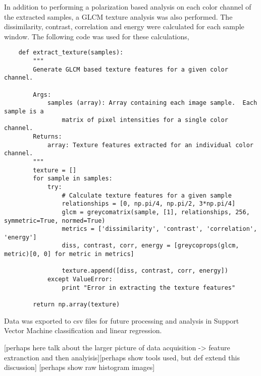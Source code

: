 In addition to performing a polarization based analysis on each color channel of the extracted samples, a GLCM texture analysis was also performed.  The dissimilarity, contrast, correlation and energy were calculated for each sample window.  The following code was used for these calculations,
\begin{lstlisting}
    def extract_texture(samples):
        """
        Generate GLCM based texture features for a given color channel.

        Args:
            samples (array): Array containing each image sample.  Each sample is a
                matrix of pixel intensities for a single color channel.
        Returns:
            array: Texture features extracted for an individual color channel.
        """
        texture = []
        for sample in samples:
            try:
                # Calculate texture features for a given sample
                relationships = [0, np.pi/4, np.pi/2, 3*np.pi/4]
                glcm = greycomatrix(sample, [1], relationships, 256, symmetric=True, normed=True)
                metrics = ['dissimilarity', 'contrast', 'correlation', 'energy']
                diss, contrast, corr, energy = [greycoprops(glcm, metric)[0, 0] for metric in metrics]

                texture.append([diss, contrast, corr, energy])
            except ValueError:
                print "Error in extracting the texture features"

        return np.array(texture)
\end{lstlisting}

Data was exported to csv files for future processing and analysis in Support Vector Machine classification and linear regression.

[perhaps here talk about the larger picture of data acquisition -> feature extranction and then analyisis][perhaps show tools used, but def extend this discussion]
[perhaps show raw histogram images]
